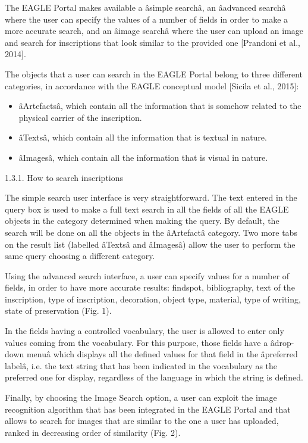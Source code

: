 The EAGLE Portal makes available a âsimple searchâ, an âadvanced searchâ where the user can specify the values of a
number of fields in order to make a more accurate search, and an âimage searchâ where the user can upload an image and
search for inscriptions that look similar to the provided one [Prandoni et al., 2014]. 

The objects that a user can search in the EAGLE Portal belong to three different categories, in accordance with the
EAGLE conceptual model [Sicila et al., 2015]:

\begin{itemize}
\item âArtefactsâ, which contain all the information that is somehow related to the physical carrier of the inscription.
\item âTextsâ, which contain all the information that is textual in nature.
\item âImagesâ, which contain all the information that is visual in nature.
\end{itemize}

\bigskip

1.3.1. How to search inscriptions


\bigskip

The simple search user interface is very straightforward. The text entered in the query box is used to make a full text
search in all the fields of all the EAGLE objects in the category determined when making the query. By default, the
search will be done on all the objects in the âArtefactâ category. Two more tabs on the result list (labelled âTextsâ
and âImagesâ) allow the user to perform the same query choosing a different category.

Using the advanced search interface, a user can specify values for a number of fields, in order to have more accurate
results: findspot, bibliography, text of the inscription, type of inscription, decoration, object type, material, type
of writing, state of preservation (Fig. 1).

In the fields having a controlled vocabulary, the user is allowed to enter only values coming from the vocabulary. For
this purpose, those fields have a âdrop-down menuâ which displays all the defined values for that field in the
âpreferred labelâ, i.e. the text string that has been indicated in the vocabulary as the preferred one for display,
regardless of the language in which the string is defined. 

Finally, by choosing the Image Search option, a user can exploit the image recognition algorithm that has been
integrated in the EAGLE Portal and that allows to search for images that are similar to the one a user has uploaded,
ranked in decreasing order of similarity (Fig. 2).


